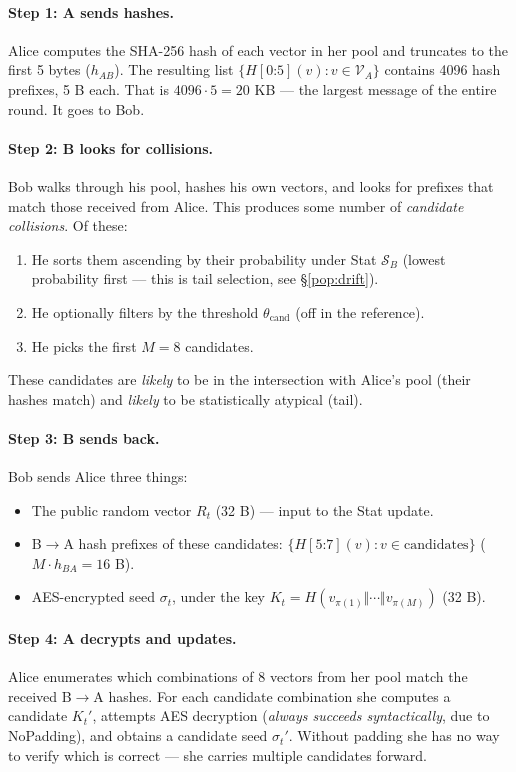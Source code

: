 \documentclass[11pt,a4paper]{article}
\begin{document}
\paragraph{Step 1: A sends hashes.}
Alice computes the SHA-256 hash of each vector in her pool and truncates to the first 5 bytes ($h_{AB}$). The resulting list $\{H[0\mathord{:}5](v) : v \in \mathcal{V}_A\}$ contains 4096 hash prefixes, 5 B each. That is $4096 \cdot 5 = 20$ KB --- the largest message of the entire round. It goes to Bob.

\paragraph{Step 2: B looks for collisions.}
Bob walks through his pool, hashes his own vectors, and looks for prefixes that match those received from Alice. This produces some number of \emph{candidate collisions}. Of these:
\begin{enumerate}[leftmargin=*]
\item He sorts them ascending by their probability under Stat $\mathcal{S}_B$ (lowest probability first --- this is tail selection, see §\ref{pop:drift}).
\item He optionally filters by the threshold $\theta_\text{cand}$ (off in the reference).
\item He picks the first $M = 8$ candidates.
\end{enumerate}
These candidates are \emph{likely} to be in the intersection with Alice's pool (their hashes match) and \emph{likely} to be statistically atypical (tail).

\paragraph{Step 3: B sends back.}
Bob sends Alice three things:
\begin{itemize}[leftmargin=*]
\item The public random vector $R_t$ (32 B) --- input to the Stat update.
\item B$\to$A hash prefixes of these candidates: $\{H[5\mathord{:}7](v) : v \in \text{candidates}\}$ ($M \cdot h_{BA} = 16$ B).
\item AES-encrypted seed $\sigma_t$, under the key $K_t = H(v_{\pi(1)} \Vert \cdots \Vert v_{\pi(M)})$ (32 B).
\end{itemize}

\paragraph{Step 4: A decrypts and updates.}
Alice enumerates which combinations of 8 vectors from her pool match the received B$\to$A hashes. For each candidate combination she computes a candidate $K_t'$, attempts AES decryption (\emph{always succeeds syntactically}, due to NoPadding), and obtains a candidate seed $\sigma_t'$. Without padding she has no way to verify which is correct --- she carries multiple candidates forward.
\end{document}
